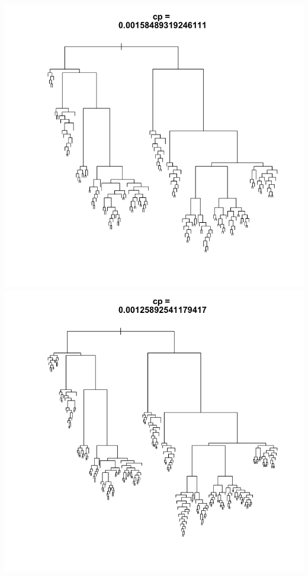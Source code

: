 \documentclass[11pt]{article}
\begin{document}
\begin{center}
\includegraphics[scale=0.25]{images/ctrl9}
\includegraphics[scale=0.25]{images/ctrl10}

\end{center}
\end{document}
